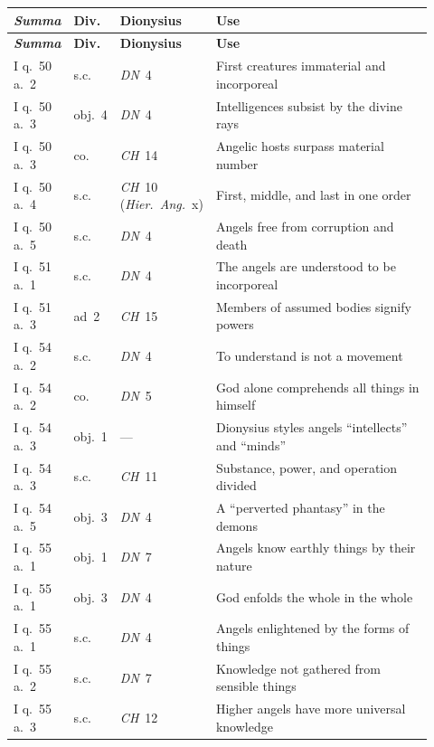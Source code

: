 {\footnotesize
\begin{longtable}{@{}>{\raggedright\arraybackslash}p{0.14\linewidth}>{\raggedright\arraybackslash}p{0.10\linewidth}>{\raggedright\arraybackslash}p{0.16\linewidth}>{\raggedright\arraybackslash}p{0.52\linewidth}@{}}
\toprule
\textbf{\emph{Summa}} & \textbf{Div.} & \textbf{Dionysius} & \textbf{Use} \\
\midrule
\endfirsthead
\toprule
\textbf{\emph{Summa}} & \textbf{Div.} & \textbf{Dionysius} & \textbf{Use} \\
\midrule
\endhead
\bottomrule
\endfoot
I q.~50 a.~2 & s.c. & \emph{DN}~4 & First creatures immaterial and incorporeal \\
I q.~50 a.~3 & obj.~4 & \emph{DN}~4 & Intelligences subsist by the divine rays \\
I q.~50 a.~3 & co. & \emph{CH}~14 & Angelic hosts surpass material number \\
I q.~50 a.~4 & s.c. & \emph{CH}~10 (\emph{Hier.\ Ang.}~x) & First, middle, and last in one order \\
I q.~50 a.~5 & s.c. & \emph{DN}~4 & Angels free from corruption and death \\
I q.~51 a.~1 & s.c. & \emph{DN}~4 & The angels are understood to be incorporeal \\
I q.~51 a.~3 & ad~2 & \emph{CH}~15 & Members of assumed bodies signify powers \\
I q.~54 a.~2 & s.c. & \emph{DN}~4 & To understand is not a movement \\
I q.~54 a.~2 & co. & \emph{DN}~5 & God alone comprehends all things in himself \\
I q.~54 a.~3 & obj.~1 & --- & Dionysius styles angels ``intellects'' and ``minds'' \\
I q.~54 a.~3 & s.c. & \emph{CH}~11 & Substance, power, and operation divided \\
I q.~54 a.~5 & obj.~3 & \emph{DN}~4 & A ``perverted phantasy'' in the demons \\
I q.~55 a.~1 & obj.~1 & \emph{DN}~7 & Angels know earthly things by their nature \\
I q.~55 a.~1 & obj.~3 & \emph{DN}~4 & God enfolds the whole in the whole \\
I q.~55 a.~1 & s.c. & \emph{DN}~4 & Angels enlightened by the forms of things \\
I q.~55 a.~2 & s.c. & \emph{DN}~7 & Knowledge not gathered from sensible things \\
I q.~55 a.~3 & s.c. & \emph{CH}~12 & Higher angels have more universal knowledge \\

\end{longtable}}
